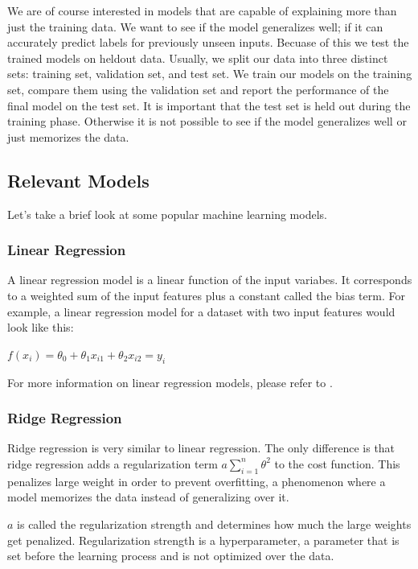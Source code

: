 We are of course interested in models that are capable of explaining more than just the training data.
We want to see if the model generalizes well; if it can accurately predict labels for previously unseen inputs.
Becuase of this we test the trained models on heldout data.
Usually, we split our data into three distinct sets: training set, validation set, and test set.
We train our models on the training set, compare them using the validation set and report the performance of the final model on the test set.
It is important that the test set is held out during the training phase.
Otherwise it is not possible to see if the model generalizes well or just memorizes the data.\parencite{ml:prml}

\subsection{Relevant Models}
Let's take a brief look at some popular machine learning models.
\subsubsection{Linear Regression}
A linear regression model is a linear function of the input variabes.
It corresponds to a weighted sum of the input features plus a constant called the bias term.\parencite{homl:4}
For example, a linear regression model for a dataset with two input features would look like this:

$f(x_i)=\theta_{0} + \theta_{1}x_{i1} + \theta_{2}x_{i2}=y_i$

For more information on linear regression models, please refer to \parencite{homl:4}.

\subsubsection{Ridge Regression}
Ridge regression is very similar to linear regression. 
The only difference is that ridge regression adds a regularization term $a\sum_{i=1}^{n}{\theta_{}^{2}}$ to the cost function. 
This penalizes large weight in order to prevent overfitting, a phenomenon where a model memorizes the data instead of generalizing over it.\parencite{homl:4}

$a$ is called the regularization strength and determines how much the large weights get penalized.
Regularization strength is a hyperparameter, a parameter that is set before the learning process and is not optimized over the data.\parencite{homl:4}

